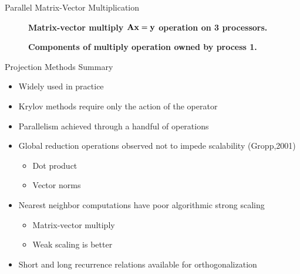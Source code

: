 \documentclass{beamer}
\begin{document}
\begin{frame}{Parallel Matrix-Vector Multiplication}

  \begin{figure}[htpb!]
    \begin{center}
      \scalebox{0.6}{  }
    \end{center}
    \caption{\textbf{Matrix-vector multiply $\mathbf{A}\mathbf{x}=\mathbf{y}$
        operation on 3 processors.}
      \label{fig:partitioned_matvec_multiply} }
  \end{figure}

  \begin{figure}[htpb!]
    \begin{center}
      \scalebox{0.7}{  }
    \end{center}
    \caption{\textbf{Components of multiply operation owned by process
        1.} }
    \label{fig:matvec_proc_1}
  \end{figure}

\end{frame}

\begin{frame}{Projection Methods Summary}

  \begin{itemize}
  \item Widely used in practice
    \medskip
  \item Krylov methods require only the action of the operator
    \medskip
  \item Parallelism achieved through a handful of operations
    \medskip
  \item Global reduction operations observed not to impede scalability
    (Gropp,2001)
    \begin{itemize}
    \item Dot product
    \item Vector norms
    \end{itemize}
    \medskip
  \item Nearest neighbor computations have poor algorithmic strong
    scaling
    \begin{itemize}
    \item Matrix-vector multiply
    \item Weak scaling is better
    \end{itemize}
    \medskip
  \item Short and long recurrence relations available for
    orthogonalization
  \end{itemize}

\end{frame}
\end{document}
